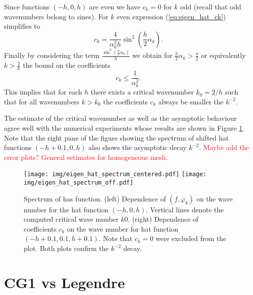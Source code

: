 \documentclass[a4paper,10pt]{article}
\newcommand{\inner}[2]{\ensuremath{\left(#1, #2\right)}}
\newcommand{\TODO}[1]{\textcolor{red}{#1}}
\begin{document}
  Since functions $(-h, 0, h)$ are even we have $c_k=0$ for $k$ odd (recall that
  odd wavenumbers belong to sines). For $k$ even expression
  (\ref{eq:eigen_hat_ck}) simplifies to
  \[
    c_k = \frac{4}{\alpha_k^2 h}\sin^2\left(\frac{h}{2}\alpha_k\right).
  \]
  Finally by considering the term
  $\frac{\sin^2\left(\frac{h}{2}\alpha_k\right)}{h}$
  we obtain for $\frac{h}{2}\alpha_k > \frac{\pi}{2}$ or equivalently 
  $k>\tfrac{2}{h}$ the bound on the coefficients
  \[
    c_k \leq \frac{1}{\alpha_k^2}.
  \]
  This implies that for each $h$ there exists a critical wavenumber $k_0=2/h$
  such that for all wavenumbers $k>k_0$ the coefficients $c_k$ always be 
  smaller the $k^{-2}$.

  The estimate of the critical wavenumber as well as the asymptotic behaviour
  agree well with the numerical experiments whose results are shown in Figure
  \ref{fig:eig_hat_spectrum}. Note that the right pane of the figure showing
  the spectrum of shifted hat functions $(-h+0.1, 0, h)$ also shows the
  asymptotic decay $k^{-2}$.
  \TODO{Maybe add the error plots?}
  \TODO{General estimates for homogeneous mesh.}

  \begin{figure}
  \begin{center}
    \texttt{[image: img/eigen\_hat\_spectrum\_centered.pdf]}
    \texttt{[image: img/eigen\_hat\_spectrum\_off.pdf]}
  \end{center}
  \label{fig:eig_hat_spectrum}
  \caption{Spectrum of has function. (left) Dependence of $\inner{f}{\varphi_k}$
    on the wave number for the hat function $(-h, 0, h)$. Vertical lines denote
    the computed critical wave number $k0$. (right) Dependence of coefficients
    $c_k$ on the wave number for hat function $(-h+0.1, 0.1, h+0.1)$. Note that
    $c_k=0$ were excluded from the plot. Both plots confirm the $k^{-2}$ decay.}
  \end{figure}
  \section{CG1 vs Legendre}

  
  
\end{document}
